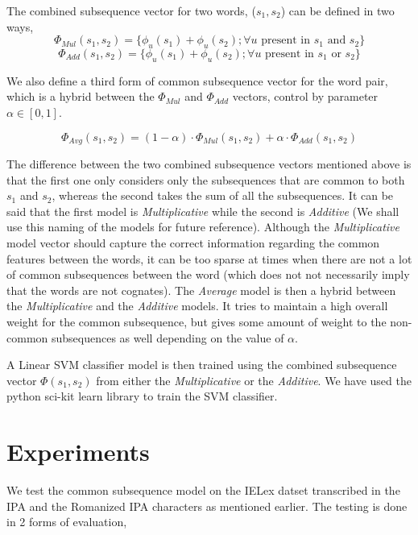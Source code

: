 The combined subsequence vector for two words, ($s_1, s_2$) can be defined in two ways,
\begin{equation}
\Phi_{Mul}(s_1, s_2) = \{\phi_u(s_1) + \phi_u(s_2); \forall u \text{ present in } s_1 \text{ and } s_2\}
\end{equation}
\begin{equation}
\Phi_{Add}(s_1, s_2) = \{\phi_u(s_1) + \phi_u(s_2); \forall u \text{ present in } s_1 \text{ or } s_2\}
\end{equation}

We also define a third form of common subsequence vector for the word pair, which is a hybrid between the $\Phi_{Mul}$ and $\Phi_{Add}$ vectors, control by parameter $\alpha \in [0,1]$.

\begin{equation}
\Phi_{Avg}(s_1, s_2) = (1-\alpha)\cdot \Phi_{Mul}(s_1, s_2) + \alpha \cdot \Phi_{Add}(s_1, s_2)
\end{equation}

The difference between the two combined subsequence vectors mentioned above is that the first one only considers only the subsequences that are common to both $s_1$ and $s_2$, whereas the second takes the sum of all the subsequences. It can be said that the first model is \textit{Multiplicative} while the second is \textit{Additive} (We shall use this naming of the models for future reference). Although the \textit{Multiplicative} model vector should capture the correct information regarding the common features between the words, it can be too sparse at times when there are not a lot of common subsequences between the word (which does not not necessarily imply that the words are not cognates). The \textit{Average} model is then a hybrid between the \textit{Multiplicative} and the \textit{Additive} models. It tries to maintain a high overall weight for the common subsequence, but gives some amount of weight to the non-common subsequences as well depending on the value of $\alpha$.

A Linear SVM classifier model is then trained using the combined subsequence vector $\Phi(s_1, s_2)$ from either the \textit{Multiplicative} or the \textit{Additive}. We have used the python sci-kit learn library to train the SVM classifier. 

\section{Experiments}
We test the common subsequence model on the IELex datset transcribed in the IPA and the Romanized IPA characters as mentioned earlier. The testing is done in 2 forms of evaluation,

